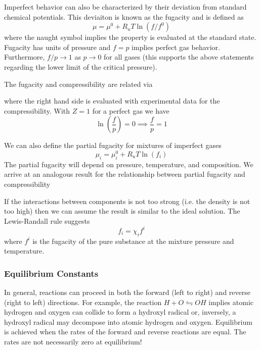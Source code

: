 \documentclass[11pt]{article}
\newcommand{\CenteredBoxed}[1]{\begin{center}\boxed{#1}\end{center}}
\newcommand{\intlim}[2]{\int\limits_{#1}^{#2}}
\begin{document}
Imperfect behavior can also be characterized by their deviation from standard chemical potentials. This deviaiton is known as the fugacity and is defined as
$$\mu=\mu^0+R_uT\ln(f/f^0)$$
where the naught symbol implies the property is evaluated at the standard state. Fugacity has units of pressure and $f=p$ implies perfect gas behavior. Furthermore, $f/p\to1$ as $p\to0$ for all gases (this supports the above statements regarding the lower limit of the critical pressure).

The fugacity and compressibility are related via
\CenteredBoxed{\ln\left(\frac{f}{p}\right)=\intlim{0}{p}(Z-1)\frac{d\xi}{\xi}}
where the right hand side is evaluated with experimental data for the compressibility. With $Z=1$ for a perfect gas we have
$$\ln\left(\frac{f}{p}\right)=0\implies\frac{f}{p}=1$$

We can also define the partial fugacity for mixtures of imperfect gases
$$\mu_i=\mu_i^0 + R_uT\ln(f_i)$$
The partial fugacity will depend on pressure, temperature, and composition. We arrive at an analogous result for the relationship between partial fugacity and compressibility
\CenteredBoxed{\ln\left(\frac{f_i}{p_i}\right) = \intlim{0}{p}\left(\frac{\hat{\nu}_i}{R_uT}-\frac{1}{\xi}\right)d\xi}

If the interactions between components is not too strong (i.e. the density is not too high) then we can assume the result is similar to the ideal solution. The Lewis-Randall rule suggests
$$f_i=\chi_if^i$$
where $f^i$ is the fugacity of the pure substance at the mixture pressure and temperature.

\subsubsection{Equilibrium Constants}
In general, reactions can proceed in both the forward (left to right) and reverse (right to left) directions. For example, the reaction $H+O\leftrightharpoons OH$ implies atomic hydrogen and oxygen can collide to form a hydroxyl radical or, inversely, a hydroxyl radical may decompose into atomic hydrogen and oxygen. Equilibrium is achieved when the rates of the forward and reverse reactions are equal. The rates are not necessarily zero at equilibrium!\\
\end{document}
